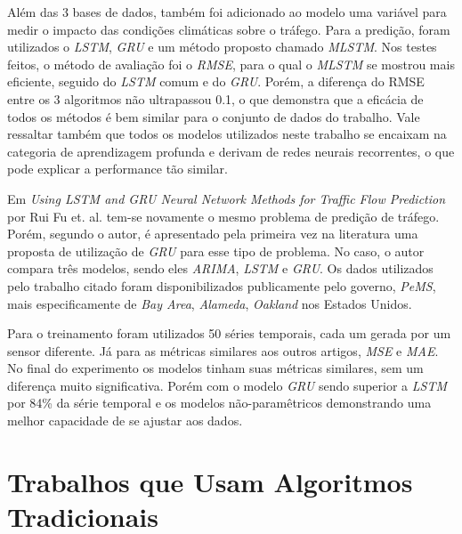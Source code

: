 Além das 3 bases de dados, também foi adicionado ao modelo uma variável para medir o impacto das condições climáticas sobre o tráfego.
Para a predição, foram utilizados o \textit{\acrshort{LSTM}}, \textit{\acrshort{GRU}} e um método proposto chamado \textit{\acrfull{MLSTM}}. Nos testes feitos, o método de avaliação foi o \textit{\acrshort{RMSE}}, para o qual o \textit{\acrshort{MLSTM}} se mostrou mais eficiente, seguido do \textit{\acrshort{LSTM}} comum e do \textit{\acrshort{GRU}}. Porém, a diferença do RMSE entre os 3 algoritmos não ultrapassou 0.1, o que demonstra que a eficácia de todos os métodos é bem similar para o conjunto de dados do trabalho. Vale ressaltar também que todos os modelos utilizados neste trabalho se encaixam na categoria de aprendizagem profunda e derivam de redes neurais recorrentes, o que pode explicar a performance tão similar.

Em \textit{Using LSTM and GRU Neural Network Methods for Traffic Flow Prediction} \cite{fu2016using} por Rui Fu et. al. tem-se novamente o mesmo problema de predição de tráfego. Porém, segundo o autor, é apresentado pela primeira vez na literatura uma proposta de utilização de \textit{\acrfull{GRU}} para esse tipo de problema. No caso, o autor compara três modelos, sendo eles \textit{\acrshort{ARIMA}}, \textit{\acrshort{LSTM}} e \textit{\acrshort{GRU}}. Os dados utilizados pelo trabalho citado foram disponibilizados publicamente pelo governo, \textit{PeMS}, mais especificamente de \textit{Bay Area}, \textit{Alameda}, \textit{Oakland} nos Estados Unidos. 

Para o treinamento foram utilizados 50 séries temporais, cada um gerada por um sensor diferente. Já para as métricas similares aos outros artigos, \textit{\acrshort{MSE}} e \textit{\acrshort{MAE}}. No final do experimento os modelos tinham suas métricas similares, sem um diferença muito significativa. Porém com o modelo \textit{\acrshort{GRU}} sendo superior a \textit{\acrshort{LSTM}} por 84\% da série temporal e os modelos não-paramêtricos demonstrando uma melhor capacidade de se ajustar aos dados.

\section{Trabalhos que Usam Algoritmos Tradicionais}


